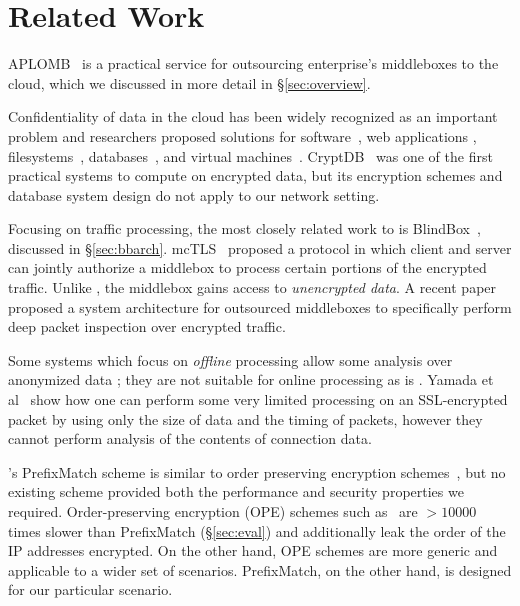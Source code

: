 
\section{Related Work}
\label{sec:related}

APLOMB~\cite{aplomb} is a practical service for outsourcing enterprise's middleboxes to the cloud, which we discussed in more detail in \S\ref{sec:overview}.

Confidentiality of data in the cloud has been widely recognized as an important problem and researchers proposed solutions for software~\cite{Baumann:Haven}, web applications \cite{giffin:hails, Mylar},  filesystems~\cite{blaze:cfs, kallahalla:plutus, goh:sirius},  databases~\cite{popa:cryptdb, blindseer},  and virtual machines~\cite{Zhang:CloudVisor}. 
CryptDB~\cite{popa:cryptdb} was one of the first practical systems to compute on encrypted data, but its encryption schemes and database system design do not apply to our network setting. 

Focusing on traffic processing, the most closely related work to \sys is BlindBox~\cite{blindbox}, discussed in \S\ref{sec:bbarch}.  mcTLS~\cite{mctls} proposed a protocol in which client and server can jointly authorize a middlebox to process certain portions of the encrypted traffic. Unlike \sys, the middlebox  gains access to {\em unencrypted data}. A recent paper~\cite{secmb} proposed a system architecture for outsourced middleboxes to specifically perform deep packet inspection over encrypted traffic.

Some systems which focus on {\it offline} processing allow some analysis over anonymized data \cite{Vern:Anonymize06, Vern:Anonymize03}; they are not suitable for online processing as is \sys.
Yamada et al~\cite{Yamada_IDS} show how one can perform some very limited processing on an SSL-encrypted packet by using only the size of data and the timing of packets, however they cannot perform analysis of the contents of connection data.

\sys's PrefixMatch scheme is similar to order preserving encryption schemes~\cite{agrawal:ope}, but no existing scheme provided both the performance and security properties we required.
Order-preserving encryption (OPE) schemes such as~\cite{boldyreva:ope, popa:mope}  are 
 $>10000$ times slower than PrefixMatch (\S\ref{sec:eval}) and additionally leak the order of  the IP addresses encrypted. On the other hand, OPE schemes are more generic and applicable to a wider set of scenarios. PrefixMatch, on the other hand, is designed for our  particular scenario.

